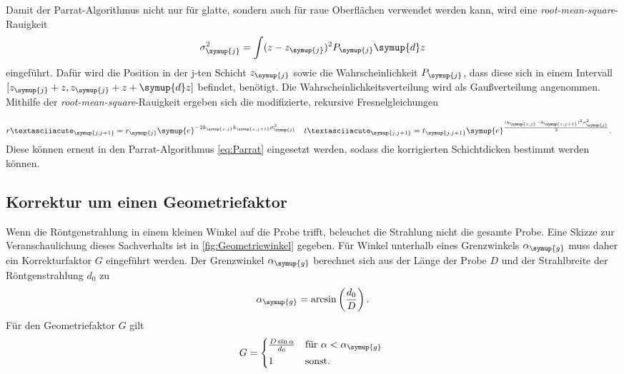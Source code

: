 Damit der Parrat-Algorithmus nicht nur für glatte, sondern auch für raue Oberflächen verwendet werden kann, wird eine \textit{root-mean-square}-Rauigkeit 
\begin{equation*}
    \sigma_{\symup{j}}^2 = \int (z-z_{\symup{j}})^2 P_{\symup{j}}\symup{d}z
\end{equation*}
eingeführt. Dafür wird die Position in der j-ten Schicht $z_{\symup{j}}$ sowie die Wahrscheinlichkeit $P_{\symup{j}}$, dass diese sich in einem Intervall 
$[z_{\symup{j}}+z, z_{\symup{j}}+z+\symup{d}z]$ befindet, benötigt. Die Wahrscheinlichkeitsverteilung wird als Gaußverteilung angenommen.
Mithilfe der \textit{root-mean-square}-Rauigkeit ergeben sich die modifizierte, rekursive Fresnelgleichungen

\begin{align}
    \label{eqn:r_korrigiert}
    r´_{\symup{j,j+1}} &= r_{\symup{j}}\symup{e}^{-2k_{\symup{z,j}}k_{\symup{z,j+1}}\sigma_{\symup{j}}^2} & t´_{\symup{j,j+1}} &= t_{\symup{j,j+1}}\symup{e}^{\frac{(k_{\symup{z,j}}-k_{\symup{z,j+1}})^2\sigma_{\symup{j}}^2}{2}}.
\end{align}
Diese können erneut in den Parrat-Algorithmus \eqref{eq:Parrat} eingesetzt werden, sodass die korrigierten Schichtdicken bestimmt werden können.

\subsection{Korrektur um einen Geometriefaktor}
Wenn die Röntgenstrahlung in einem kleinen Winkel auf die Probe trifft, beleuchet die Strahlung nicht die gesamte Probe. Eine Skizze zur Veranschaulichung dieses Sachverhalts ist in
\autoref{fig:Geometriewinkel} gegeben. Für Winkel unterhalb eines Grenzwinkels $\alpha_{\symup{g}}$ muss daher ein Korrekturfaktor $G$ eingeführt werden.
Der Grenzwinkel $\alpha_{\symup{g}}$ berechnet sich aus der Länge der Probe $D$ und der Strahlbreite der Röntgenstrahlung $d_0$ zu
\begin{equation}
    \label{eqn:a_g}
    \alpha_{\symup{g}} = \arcsin \left(\frac{d_0}{D}\right).
\end{equation}
Für den Geometriefaktor $G$ gilt
\begin{equation}
    G = 
    \begin{cases*}
        \frac{D\sin \alpha}{d_0}  & für $\alpha < \alpha_{\symup{g}}$ \\
        1 & sonst.
    \end{cases*}
    \label{eq:Geometriefaktor}
\end{equation}

